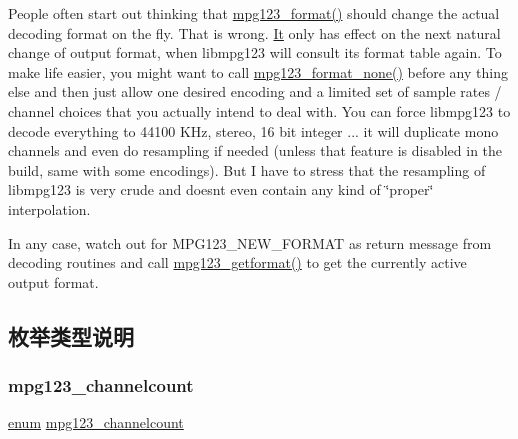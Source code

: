 People often start out thinking that \hyperlink{group__mpg123__output_gadad5794afc300a997e517dbe397dc2c7}{mpg123\+\_\+format()} should change the actual decoding format on the fly. That is wrong. \hyperlink{class_it}{It} only has effect on the next natural change of output format, when libmpg123 will consult its format table again. To make life easier, you might want to call \hyperlink{group__mpg123__output_ga931ca238347de394901c3baa13e7a8f8}{mpg123\+\_\+format\+\_\+none()} before any thing else and then just allow one desired encoding and a limited set of sample rates / channel choices that you actually intend to deal with. You can force libmpg123 to decode everything to 44100 K\+Hz, stereo, 16 bit integer ... it will duplicate mono channels and even do resampling if needed (unless that feature is disabled in the build, same with some encodings). But I have to stress that the resampling of libmpg123 is very crude and doesn\textquotesingle{}t even contain any kind of \char`\"{}proper\char`\"{} interpolation.

In any case, watch out for M\+P\+G123\+\_\+\+N\+E\+W\+\_\+\+F\+O\+R\+M\+AT as return message from decoding routines and call \hyperlink{group__mpg123__output_gae5e04c7522d620e122009db359cc6dc5}{mpg123\+\_\+getformat()} to get the currently active output format. 

\subsection{枚举类型说明}
\mbox{\label{group__mpg123__output_ga94df916cae2fc81b8a6df88c1728eb1c}} 
\subsubsection{\texorpdfstring{mpg123\+\_\+channelcount}{mpg123\_channelcount}}
{\footnotesize\ttfamily \hyperlink{interfaceenum}{enum} \hyperlink{group__mpg123__output_ga94df916cae2fc81b8a6df88c1728eb1c}{mpg123\+\_\+channelcount}}

